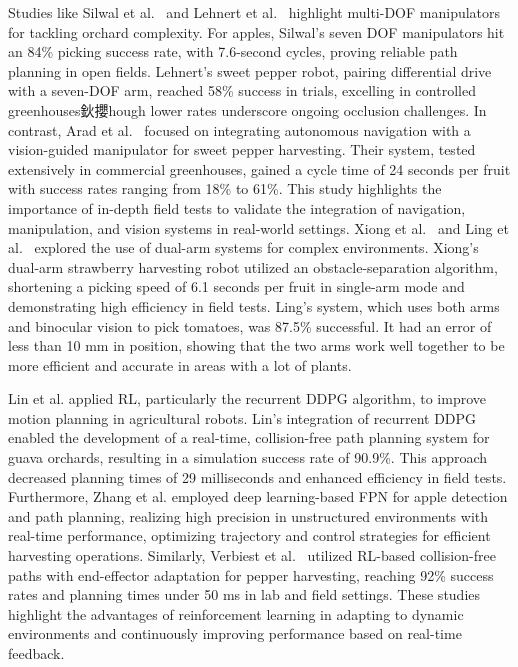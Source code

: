 \documentclass[a4paper,fleqn]{cas-dc}
\begin{document}
Studies like Silwal et al.~\cite{silwal2017design} and Lehnert et al.~\cite{lehnert2017autonomous} highlight multi-DOF manipulators for tackling orchard complexity. For apples, Silwal's seven DOF manipulators hit an 84\% picking success rate, with 7.6-second cycles, proving reliable path planning in open fields. Lehnert's sweet pepper robot, pairing differential drive with a seven-DOF arm, reached 58\% success in trials, excelling in controlled greenhouses鈥攖hough lower rates underscore ongoing occlusion challenges.
In contrast, Arad et al.~\cite{arad2020development} focused on integrating autonomous navigation with a vision-guided manipulator for sweet pepper harvesting. Their system, tested extensively in commercial greenhouses, gained a cycle time of 24 seconds per fruit with success rates ranging from 18\% to 61\%. This study highlights the importance of in-depth field tests to validate the integration of navigation, manipulation, and vision systems in real-world settings.
Xiong et al.~\cite{xiong2020autonomous} and Ling et al.~\cite{ling2019dual} explored the use of dual-arm systems for complex environments. Xiong's dual-arm strawberry harvesting robot utilized an obstacle-separation algorithm, shortening a picking speed of 6.1 seconds per fruit in single-arm mode and demonstrating high efficiency in field tests. Ling's system, which uses both arms and binocular vision to pick tomatoes, was 87.5\% successful. It had an error of less than 10 mm in position, showing that the two arms work well together to be more efficient and accurate in areas with a lot of plants.

Lin et al.\cite{lin2021collision} applied RL, particularly the recurrent DDPG algorithm, to improve motion planning in agricultural robots. Lin's integration of recurrent DDPG enabled the development of a real-time, collision-free path planning system for guava orchards, resulting in a simulation success rate of 90.9\%. This approach decreased planning times of 29 milliseconds and enhanced efficiency in field tests. 
Furthermore, Zhang et al.\cite{zhang2023deep} employed deep learning-based FPN for apple detection and path planning, realizing high precision in unstructured environments with real-time performance, optimizing trajectory and control strategies for efficient harvesting operations. 
Similarly, Verbiest et al.~\cite{verbiest2022path} utilized RL-based collision-free paths with end-effector adaptation for pepper harvesting, reaching 92\% success rates and planning times under 50 ms in lab and field settings. These studies highlight the advantages of reinforcement learning in adapting to dynamic environments and continuously improving performance based on real-time feedback.
\end{document}
